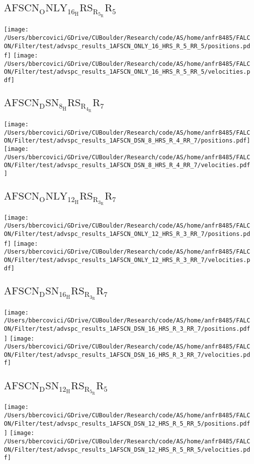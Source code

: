 \subsection{$\mathrm{AFSCN_ONLY_16_HRS_R_5_RR_5}$}
\texttt{[image: /Users/bbercovici/GDrive/CUBoulder/Research/code/AS/home/anfr8485/FALCON/Filter/test/advspc\_results\_1AFSCN\_ONLY\_16\_HRS\_R\_5\_RR\_5/positions.pdf]}
\texttt{[image: /Users/bbercovici/GDrive/CUBoulder/Research/code/AS/home/anfr8485/FALCON/Filter/test/advspc\_results\_1AFSCN\_ONLY\_16\_HRS\_R\_5\_RR\_5/velocities.pdf]}
\subsection{$\mathrm{AFSCN_DSN_8_HRS_R_4_RR_7}$}
\texttt{[image: /Users/bbercovici/GDrive/CUBoulder/Research/code/AS/home/anfr8485/FALCON/Filter/test/advspc\_results\_1AFSCN\_DSN\_8\_HRS\_R\_4\_RR\_7/positions.pdf]}
\texttt{[image: /Users/bbercovici/GDrive/CUBoulder/Research/code/AS/home/anfr8485/FALCON/Filter/test/advspc\_results\_1AFSCN\_DSN\_8\_HRS\_R\_4\_RR\_7/velocities.pdf]}
\subsection{$\mathrm{AFSCN_ONLY_12_HRS_R_3_RR_7}$}
\texttt{[image: /Users/bbercovici/GDrive/CUBoulder/Research/code/AS/home/anfr8485/FALCON/Filter/test/advspc\_results\_1AFSCN\_ONLY\_12\_HRS\_R\_3\_RR\_7/positions.pdf]}
\texttt{[image: /Users/bbercovici/GDrive/CUBoulder/Research/code/AS/home/anfr8485/FALCON/Filter/test/advspc\_results\_1AFSCN\_ONLY\_12\_HRS\_R\_3\_RR\_7/velocities.pdf]}
\subsection{$\mathrm{AFSCN_DSN_16_HRS_R_3_RR_7}$}
\texttt{[image: /Users/bbercovici/GDrive/CUBoulder/Research/code/AS/home/anfr8485/FALCON/Filter/test/advspc\_results\_1AFSCN\_DSN\_16\_HRS\_R\_3\_RR\_7/positions.pdf]}
\texttt{[image: /Users/bbercovici/GDrive/CUBoulder/Research/code/AS/home/anfr8485/FALCON/Filter/test/advspc\_results\_1AFSCN\_DSN\_16\_HRS\_R\_3\_RR\_7/velocities.pdf]}
\subsection{$\mathrm{AFSCN_DSN_12_HRS_R_5_RR_5}$}
\texttt{[image: /Users/bbercovici/GDrive/CUBoulder/Research/code/AS/home/anfr8485/FALCON/Filter/test/advspc\_results\_1AFSCN\_DSN\_12\_HRS\_R\_5\_RR\_5/positions.pdf]}
\texttt{[image: /Users/bbercovici/GDrive/CUBoulder/Research/code/AS/home/anfr8485/FALCON/Filter/test/advspc\_results\_1AFSCN\_DSN\_12\_HRS\_R\_5\_RR\_5/velocities.pdf]}
